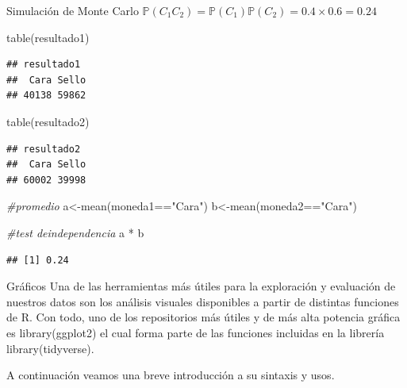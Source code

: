 \documentclass[
  8pt,
  ignorenonframetext,
]{beamer}
\newenvironment{Shaded}{\begin{snugshade}}{\end{snugshade}}
\newcommand{\CommentTok}[1]{\textcolor[rgb]{0.56,0.35,0.01}{\textit{#1}}}
\newcommand{\FunctionTok}[1]{\textcolor[rgb]{0.00,0.00,0.00}{#1}}
\newcommand{\NormalTok}[1]{#1}
\newcommand{\OtherTok}[1]{\textcolor[rgb]{0.56,0.35,0.01}{#1}}
\newcommand{\SpecialCharTok}[1]{\textcolor[rgb]{0.00,0.00,0.00}{#1}}
\newcommand{\StringTok}[1]{\textcolor[rgb]{0.31,0.60,0.02}{#1}}
\begin{document}
\begin{frame}[fragile]{Simulación de Monte Carlo}
\protect\hypertarget{simulaciuxf3n-de-monte-carlo-1}{}
\(\mathbb{P}(C_{1}C_{2}) = \mathbb{P}(C_{1})\mathbb{P}(C_{2}) = 0.4 \times 0.6 = 0.24\)

\begin{Shaded}
\begin{Highlighting}[]
\FunctionTok{table}\NormalTok{(resultado1)}
\end{Highlighting}
\end{Shaded}

\begin{verbatim}
## resultado1
##  Cara Sello 
## 40138 59862
\end{verbatim}

\begin{Shaded}
\begin{Highlighting}[]
\FunctionTok{table}\NormalTok{(resultado2)}
\end{Highlighting}
\end{Shaded}

\begin{verbatim}
## resultado2
##  Cara Sello 
## 60002 39998
\end{verbatim}

\begin{Shaded}
\begin{Highlighting}[]
\CommentTok{\#promedio}
\NormalTok{a}\OtherTok{\textless{}{-}}\FunctionTok{mean}\NormalTok{(moneda1}\SpecialCharTok{==}\StringTok{"Cara"}\NormalTok{)}
\NormalTok{b}\OtherTok{\textless{}{-}}\FunctionTok{mean}\NormalTok{(moneda2}\SpecialCharTok{==}\StringTok{"Cara"}\NormalTok{)}

\CommentTok{\#test deindependencia}
\NormalTok{a }\SpecialCharTok{*}\NormalTok{ b}
\end{Highlighting}
\end{Shaded}

\begin{verbatim}
## [1] 0.24
\end{verbatim}
\end{frame}

\begin{frame}{Gráficos}
\protect\hypertarget{gruxe1ficos}{}
Una de las herramientas más útiles para la exploración y evaluación de
nuestros datos son los análisis visuales disponibles a partir de
distintas funciones de R. Con todo, uno de los repositorios más útiles y
de más alta potencia gráfica es library(ggplot2) el cual forma parte de
las funciones incluidas en la librería library(tidyverse).

A continuación veamos una breve introducción a su sintaxis y usos.
\end{frame}
\end{document}

